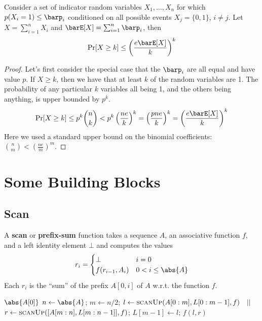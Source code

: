\documentclass[11pt]{article}
\begin{document}
\begin{theorem}[]
Consider a set of indicator random variables \(X_1,\dots,X_n\) for which \(p(X_i=1)\le\barp_i\) conditioned on
all possible events \(X_j=\{0,1\}\), \(i\neq j\). Let \(X=\sum_{i=1}^nX_i\) and \(\barE[X]=\sum_{i=1}^n\barp_i\),
then
\begin{equation*}
\Pr[X\ge k]\le\left( \frac{e\barE[X]}{k} \right)^k
\end{equation*}
\end{theorem}

\begin{proof}
Let's first consider the special case that the \(\barp_i\) are all equal and have value \(p\). If
\(X\ge k\), then we have that at least \(k\) of the random variables are 1. The probability of any
particular \(k\) variables all being 1, and the others being anything, is upper bounded by \(p^k\).
\begin{equation*}
\Pr[X\ge k]\le p^k\binom{n}{k}<p^k\left(\frac{ne}{k}\right)^k
=\left(\frac{pne}{k}\right)^k=
\left(\frac{e\barE[X]}{k}\right)^k
\end{equation*}
Here we used a standard upper bound on the binomial coefficients: \(\binom{n}{m}<\left(\frac{ne}{m}\right)^m\).
\end{proof}
\section{Some Building Blocks}
\label{sec:org7aecbdf}
\subsection{Scan}
\label{sec:org75caf52}
A \textbf{scan} or \textbf{prefix-sum} function takes a sequence \(A\), an associative function \(f\), and a left
identity element \(\bot\) and computes the values
\begin{equation*}
r_i=
\begin{cases}
\bot&i=0\\
f(r_{i-1},A_i)&0<i\le\abs{A}
\end{cases}
\end{equation*}
Each \(r_i\) is the ``sum'' of the prefix \(A[0,i]\) of \(A\) w.r.t. the function \(f\).

\begin{algorithmic}
        \Return \(\abs{A[0]}\)
\Else
        \State \(n\gets\abs{A}\);
        \State \(m\gets n/2\);
        \State \(l\gets\textsc{scanUp}(A[0:m],L[0:m-1],f)\quad||\)
        \State \(r\gets\textsc{scanUp}([A[m:n],L[m:n-1]],f)\);
        \State \(L[m-1]\gets l\);
        \State \Return \(f(l,r)\)
\EndIf
\EndFunction
\end{algorithmic}
\end{document}
